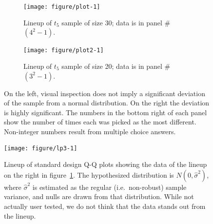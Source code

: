 \documentclass{article}\usepackage[]{graphicx}\usepackage[]{color}
\newenvironment{knitrout}{}{} %
\newcommand{\hh}[1]{{\color{magenta} #1}}
\begin{document}
\begin{figure}
\begin{subfigure}[t]{.49\textwidth}
\caption{Lineup of $t_5$ sample of size 30; data is in panel \#$(4^2-1)$.}

\texttt{[image: figure/plot-1]} 


\end{subfigure}
\begin{subfigure}[t]{.49\textwidth}
\caption{Lineup of $t_5$ sample of size 20; data is in panel \#$(3^2-1)$.}

\texttt{[image: figure/plot2-1]} 


\end{subfigure}
\caption{\label{fig:lpnorm}  \hh{On the left, visual inspection does not imply  a significant deviation of the sample from a normal distribution. On the right the deviation is highly significant.} \hh{The numbers in the bottom right of each panel show the number of times each was picked as the most different. } %
Non-integer numbers result from multiple choice answers. %
}
\end{figure}
\afterpage{\clearpage}

\begin{figure}
\centering
\begin{knitrout}
\color{fgcolor}
\texttt{[image: figure/lp3-1]} 

\end{knitrout}
\caption{\label{fig:lp3} Lineup of standard design Q-Q plots showing the data of the lineup on the right in figure~\ref{fig:lpnorm}. The hypothesized distribution is $N(0, \widehat{\sigma}^2)$, where $\widehat{\sigma}^2$ is estimated as the regular (i.e.~non-robust) sample variance, and nulls are drawn from that distribution. While not actually user tested, we do not think that the data stands out from the lineup.}
\end{figure}
\afterpage{\clearpage}
\end{document}
